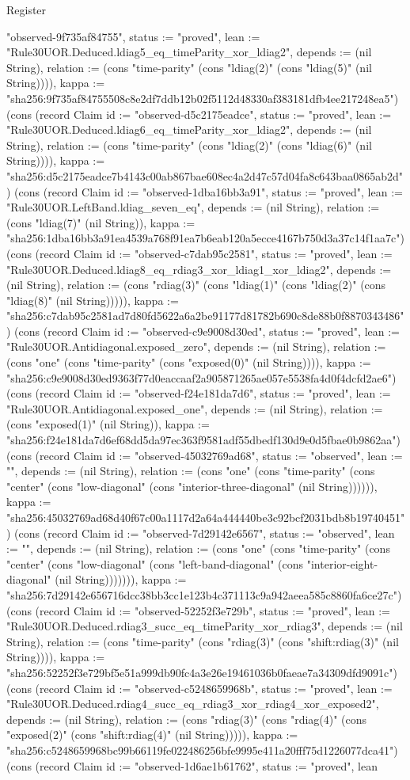 \begin{lexlean}{Register}
\begin{semanticmodule}
{"observed-9f735af84755", status := "proved", lean := "Rule30UOR.Deduced.ldiag5_eq_timeParity_xor_ldiag2", depends := (nil String), relation := (cons "time-parity" (cons "ldiag(2)" (cons "ldiag(5)" (nil String)))), kappa := "sha256:9f735af84755508c8e2df7ddb12b02f5112d48330af383181dfb4ee217248ea5"}) (cons (record Claim {id := "observed-d5c2175eadce", status := "proved", lean := "Rule30UOR.Deduced.ldiag6_eq_timeParity_xor_ldiag2", depends := (nil String), relation := (cons "time-parity" (cons "ldiag(2)" (cons "ldiag(6)" (nil String)))), kappa := "sha256:d5c2175eadce7b4143c00ab867bae608ec4a2d47c57d04fa8c643baa0865ab2d"}) (cons (record Claim {id := "observed-1dba16bb3a91", status := "proved", lean := "Rule30UOR.LeftBand.ldiag_seven_eq", depends := (nil String), relation := (cons "ldiag(7)" (nil String)), kappa := "sha256:1dba16bb3a91ea4539a768f91ea7b6eab120a5ecce4167b750d3a37c14f1aa7c"}) (cons (record Claim {id := "observed-c7dab95c2581", status := "proved", lean := "Rule30UOR.Deduced.ldiag8_eq_rdiag3_xor_ldiag1_xor_ldiag2", depends := (nil String), relation := (cons "rdiag(3)" (cons "ldiag(1)" (cons "ldiag(2)" (cons "ldiag(8)" (nil String))))), kappa := "sha256:c7dab95c2581ad7d80fd5622a6a2be91177d81782b690c8de88b0f8870343486"}) (cons (record Claim {id := "observed-c9e9008d30ed", status := "proved", lean := "Rule30UOR.Antidiagonal.exposed_zero", depends := (nil String), relation := (cons "one" (cons "time-parity" (cons "exposed(0)" (nil String)))), kappa := "sha256:c9e9008d30ed9363f77d0eaccaaf2a905871265ae057e5538fa4d0f4dcfd2ae6"}) (cons (record Claim {id := "observed-f24e181da7d6", status := "proved", lean := "Rule30UOR.Antidiagonal.exposed_one", depends := (nil String), relation := (cons "exposed(1)" (nil String)), kappa := "sha256:f24e181da7d6ef68dd5da97ec363f9581adf55dbedf130d9e0d5fbae0b9862aa"}) (cons (record Claim {id := "observed-45032769ad68", status := "observed", lean := "", depends := (nil String), relation := (cons "one" (cons "time-parity" (cons "center" (cons "low-diagonal" (cons "interior-three-diagonal" (nil String)))))), kappa := "sha256:45032769ad68d40f67c00a1117d2a64a444440be3c92bcf2031bdb8b19740451"}) (cons (record Claim {id := "observed-7d29142e6567", status := "observed", lean := "", depends := (nil String), relation := (cons "one" (cons "time-parity" (cons "center" (cons "low-diagonal" (cons "left-band-diagonal" (cons "interior-eight-diagonal" (nil String))))))), kappa := "sha256:7d29142e656716dcc38bb3cc1e123b4c371113c9a942aeea585c8860fa6ce27c"}) (cons (record Claim {id := "observed-52252f3e729b", status := "proved", lean := "Rule30UOR.Deduced.rdiag3_succ_eq_timeParity_xor_rdiag3", depends := (nil String), relation := (cons "time-parity" (cons "rdiag(3)" (cons "shift:rdiag(3)" (nil String)))), kappa := "sha256:52252f3e729bf5e51a999db90fc4a3e26e19461036b0faeae7a34309dfd9091c"}) (cons (record Claim {id := "observed-c5248659968b", status := "proved", lean := "Rule30UOR.Deduced.rdiag4_succ_eq_rdiag3_xor_rdiag4_xor_exposed2", depends := (nil String), relation := (cons "rdiag(3)" (cons "rdiag(4)" (cons "exposed(2)" (cons "shift:rdiag(4)" (nil String))))), kappa := "sha256:c5248659968bc99b66119fe022486256bfe9995e411a20fff75d1226077dca41"}) (cons (record Claim {id := "observed-1d6ae1b61762", status := "proved", lean }
\end{semanticmodule}
\end{lexlean}
